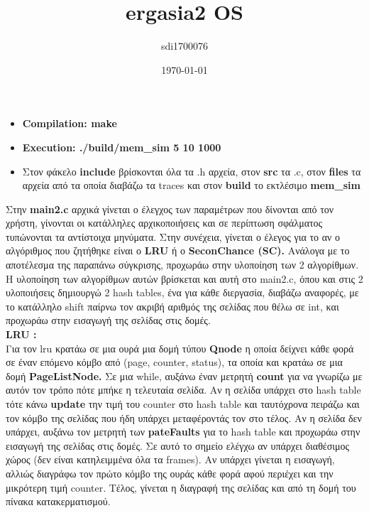 \documentclass[12pt]{article}
\begin{document}
\title{ergasia2 OS} 
\author{sdi1700076}
\date{\today}
\maketitle

    \begin{itemize}
        \item \textbf{Compilation: make }
        \item \textbf{Execution: ./build/mem\_sim 5 10 1000}
        \item Στον φάκελο \textbf{include} βρίσκονται όλα τα .h αρχεία, στον \textbf{src} τα .c,
        στον \textbf{files} τα αρχεία από τα οποία διαβάζω τα traces και στον \textbf{build} το εκτλέσιμο 
        \textbf{mem\_sim\\}
    \end{itemize}

    Στην \textbf{main2.c} αρχικά γίνεται ο έλεγχος των παραμέτρων που δίνονται από τον χρήστη, γίνονται οι κατάλληλες αρχικοποιήσεις
    και σε περίπτωση σφάλματος τυπώνονται τα αντίστοιχα μηνύματα. Στην συνέχεια, γίνεται ο έλεγος για το αν ο αλγόριθμος που ζητήθηκε είναι ο
    \textbf{LRU} ή ο \textbf{SeconChance (SC).} Ανάλογα με το αποτέλεσμα της παραπάνω σύγκρισης, προχωράω στην υλοποίηση των 2 αλγορίθμων. \\
    Η υλοποίηση των αλγορίθμων αυτών βρίσκεται και αυτή στο main2.c, όπου και στις 2 υλοποιήσεις δημιουργώ 2 hash tables, ένα για κάθε διεργασία,
    διαβάζω αναφορές, με το κατάλληλο shift παίρνω τον ακριβή αριθμός της σελίδας που θέλω σε int, και προχωράω στην εισαγωγή της σελίδας στις δομές. \\


    \textbf{LRU : \\}
    Για τον lru κρατάω σε μια ουρά μια δομή τύπου \textbf{Qnode} η οποία δείχνει κάθε φορά σε έναν επόμενο κόμβο από (page, counter, status), τα οποία
    και κρατάω σε μια δομή \textbf{PageListNode.} Σε μια while, αυξάνω έναν μετρητή \textbf{count} για να γνωρίζω με αυτόν τον τρόπο πότε μπήκε η τελευταία σελίδα.
    Αν η σελίδα υπάρχει στο hash table τότε κάνω \textbf{update} την τιμή του counter στο hash table και ταυτόχρονα πειράζω και τον κόμβο της σελίδας που ήδη υπάρχει
    μεταφέροντάς τον στο τέλος. Αν η σελίδα δεν υπάρχει, αυξάνω τον μετρητή των \textbf{pateFaults} για το hash table και προχωράω στην εισαγωγή της σελίδας στις δομές.
    Σε αυτό το σημείο ελέγχω αν υπάρχει διαθέσιμος χώρος (δεν είναι κατηλειμμένα όλα τα frames). Αν υπάρχει γίνεται η εισαγωγή, αλλιώς
    διαγράφω τον πρώτο κόμβο της ουράς κάθε φορά αφού περιέχει και την μικρότερη τιμή counter. Τέλος, γίνεται η διαγραφή της σελίδας και από τη δομή του πίνακα
    κατακερματισμού. \\ 
\end{document}
